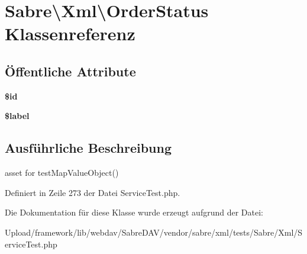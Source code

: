 \hypertarget{class_sabre_1_1_xml_1_1_order_status}{}\section{Sabre\textbackslash{}Xml\textbackslash{}Order\+Status Klassenreferenz}
\label{class_sabre_1_1_xml_1_1_order_status}
\subsection*{Öffentliche Attribute}
\begin{DoxyCompactItemize}
\item 
\mbox{\label{class_sabre_1_1_xml_1_1_order_status_a994ab26b39a2fb4c1f8bd07880d1137a}} 
{\bfseries \$id}
\item 
\mbox{\label{class_sabre_1_1_xml_1_1_order_status_a0a983a71a8383fe76d4ad5341dbd4a3b}} 
{\bfseries \$label}
\end{DoxyCompactItemize}


\subsection{Ausführliche Beschreibung}
asset for test\+Map\+Value\+Object() 

Definiert in Zeile 273 der Datei Service\+Test.\+php.



Die Dokumentation für diese Klasse wurde erzeugt aufgrund der Datei\+:\begin{DoxyCompactItemize}
\item 
Upload/framework/lib/webdav/\+Sabre\+D\+A\+V/vendor/sabre/xml/tests/\+Sabre/\+Xml/Service\+Test.\+php\end{DoxyCompactItemize}
